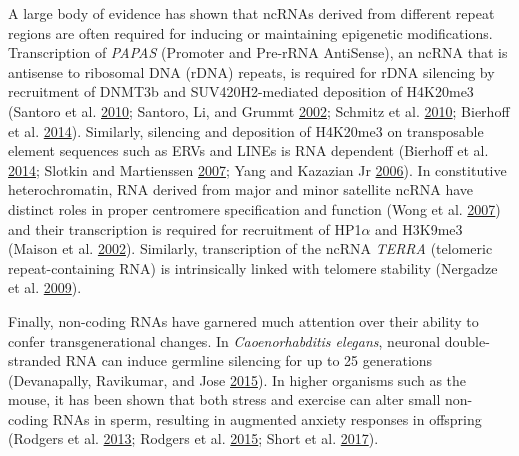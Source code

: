 \documentclass[onehalf,12pt]{beavtex}
\begin{document}
  A large body of evidence has shown that ncRNAs derived from different
  repeat regions are often required for inducing or maintaining epigenetic
  modifications. Transcription of \emph{PAPAS} (Promoter and Pre-rRNA
  AntiSense), an ncRNA that is antisense to ribosomal DNA (rDNA) repeats,
  is required for rDNA silencing by recruitment of DNMT3b and
  SUV420H2-mediated deposition of H4K20me3 (Santoro et al.
  \protect\hyperlink{ref-SantoroIntergenictranscriptsoriginating2010}{2010};
  Santoro, Li, and Grummt
  \protect\hyperlink{ref-Santoronucleolarremodelingcomplex2002}{2002};
  Schmitz et al.
  \protect\hyperlink{ref-SchmitzInteractionnoncodingRNA2010}{2010};
  Bierhoff et al.
  \protect\hyperlink{ref-BierhoffQuiescenceInducedLncRNAsTrigger2014}{2014}).
  Similarly, silencing and deposition of H4K20me3 on transposable element
  sequences such as ERVs and LINEs is RNA dependent (Bierhoff et al.
  \protect\hyperlink{ref-BierhoffQuiescenceInducedLncRNAsTrigger2014}{2014};
  Slotkin and Martienssen
  \protect\hyperlink{ref-SlotkinTransposableelementsepigenetic2007}{2007};
  Yang and Kazazian Jr
  \protect\hyperlink{ref-YangL1retrotranspositionsuppressed2006}{2006}).
  In constitutive heterochromatin, RNA derived from major and minor
  satellite ncRNA have distinct roles in proper centromere specification
  and function (Wong et al.
  \protect\hyperlink{ref-WongCentromereRNAkey2007}{2007}) and their
  transcription is required for recruitment of HP1\(\alpha\) and H3K9me3
  (Maison et al.
  \protect\hyperlink{ref-MaisonHigherorderstructurepericentric2002}{2002}).
  Similarly, transcription of the ncRNA \emph{TERRA} (telomeric
  repeat-containing RNA) is intrinsically linked with telomere stability
  (Nergadze et al.
  \protect\hyperlink{ref-NergadzeCpGislandpromotersdrive2009}{2009}).
  
  Finally, non-coding RNAs have garnered much attention over their ability
  to confer transgenerational changes. In \emph{Caoenorhabditis elegans},
  neuronal double-stranded RNA can induce germline silencing for up to 25
  generations (Devanapally, Ravikumar, and Jose
  \protect\hyperlink{ref-DevanapallyDoublestrandedRNAmade2015}{2015}). In
  higher organisms such as the mouse, it has been shown that both stress
  and exercise can alter small non-coding RNAs in sperm, resulting in
  augmented anxiety responses in offspring (Rodgers et al.
  \protect\hyperlink{ref-RodgersPaternalStressExposure2013}{2013}; Rodgers
  et al.
  \protect\hyperlink{ref-RodgersTransgenerationalepigeneticprogramming2015}{2015};
  Short et al.
  \protect\hyperlink{ref-ShortExercisealtersmouse2017a}{2017}).
  
\end{document}
